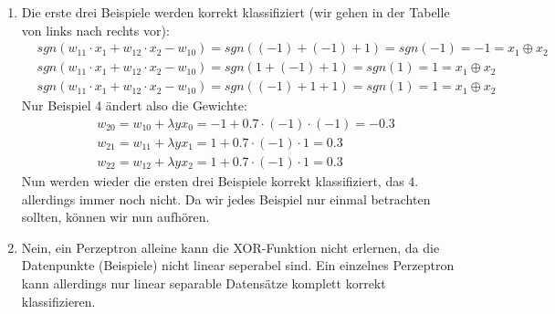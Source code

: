 \documentclass[a4paper,10pt]{article}
\begin{document}
    \begin{enumerate}[~~a.)]
	 \item
	 Die erste drei Beispiele werden korrekt klassifiziert (wir gehen in der Tabelle von links nach rechts vor): \\
	 \begin{align*}
	     &sgn(w_{11} \cdot x_1+w_{12} \cdot x_2 - w_{10}) = sgn((-1) + (-1) + 1) = sgn(-1) = -1 = x_1 \oplus x_2 \\
	     &sgn(w_{11} \cdot x_1+w_{12} \cdot x_2 - w_{10}) = sgn(1 + (-1) + 1) = sgn(1) = 1 = x_1 \oplus x_2\\
	     &sgn(w_{11} \cdot x_1+w_{12} \cdot x_2 - w_{10}) = sgn((-1) + 1 + 1) = sgn(1) = 1 = x_1 \oplus x_2
	 \end{align*}
	 Nur Beispiel 4 ändert also die Gewichte:
	 \begin{align*}
        &w_{20} = w_{10} + \lambda y x_0 = -1 + 0.7 \cdot (-1) \cdot (-1) = -0.3 \\
        &w_{21} = w_{11} + \lambda y x_1 = 1 + 0.7 \cdot (-1) \cdot 1 = 0.3\\
        &w_{22} = w_{12} + \lambda y x_2 = 1 + 0.7 \cdot (-1) \cdot 1 = 0.3
	 \end{align*}
	 Nun werden wieder die ersten drei Beispiele korrekt klassifiziert, das 4. allerdings immer noch nicht. Da wir jedes Beispiel nur einmal betrachten sollten, können wir nun aufhören.
	 
	 \item
	 Nein, ein Perzeptron alleine kann die XOR-Funktion nicht erlernen, da die Datenpunkte (Beispiele) nicht linear seperabel sind. Ein einzelnes Perzeptron kann allerdings nur linear separable Datensätze komplett korrekt klassifizieren.
	 

\end{enumerate}
\end{document}
